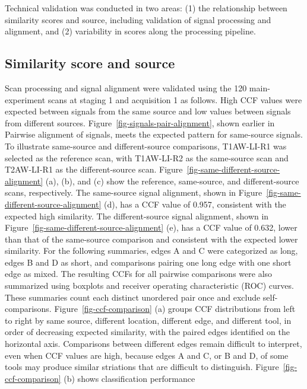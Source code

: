 \documentclass[11pt,a4paper]{article}
\begin{document}
Technical validation was conducted in two areas: (1) the relationship
between similarity scores and source, including validation of signal
processing and alignment, and (2) variability in scores along the
processing pipeline.

\subsection*{Similarity score and
source}\label{sec-similarity-score-and-source}

Scan processing and signal alignment were validated using the 120
main-experiment scans at staging 1 and acquisition 1 as follows. High
CCF values were expected between signals from the same source and low
values between signals from different sources.
Figure~\ref{fig-signals-pair-alignment}, shown earlier in Pairwise
alignment of signals, meets the expected pattern for same-source
signals. To illustrate same-source and different-source comparisons,
T1AW-LI-R1 was selected as the reference scan, with T1AW-LI-R2 as the
same-source scan and T2AW-LI-R1 as the different-source scan.
Figure~\ref{fig-same-different-source-alignment} (a), (b), and (c) show
the reference, same-source, and different-source scans, respectively.
The same-source signal alignment, shown in
Figure~\ref{fig-same-different-source-alignment} (d), has a CCF value of
0.957, consistent with the expected high similarity. The
different-source signal alignment, shown in
Figure~\ref{fig-same-different-source-alignment} (e), has a CCF value of
0.632, lower than that of the same-source comparison and consistent with
the expected lower similarity. For the following summaries, edges A and
C were categorized as long, edges B and D as short, and comparisons
pairing one long edge with one short edge as mixed. The resulting CCFs
for all pairwise comparisons were also summarized using boxplots and
receiver operating characteristic (ROC) curves. These summaries count
each distinct unordered pair once and exclude self-comparisons.
Figure~\ref{fig-ccf-comparison} (a) groups CCF distributions from left
to right by same source, different location, different edge, and
different tool, in order of decreasing expected similarity, with the
paired edges identified on the horizontal axis. Comparisons between
different edges remain difficult to interpret, even when CCF values are
high, because edges A and C, or B and D, of some tools may produce
similar striations that are difficult to distinguish.
Figure~\ref{fig-ccf-comparison} (b) shows classification performance
\end{document}
